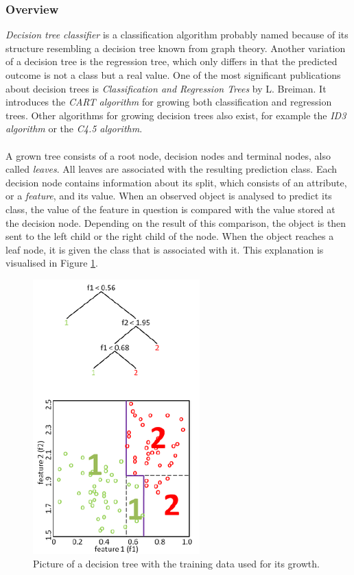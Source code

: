 \documentclass[11pt]{article}
\begin{document}
      \subsubsection{Overview}
        {\it Decision tree classifier} is a classification algorithm probably named because of its structure resembling a decision tree known from graph theory. Another variation of a decision tree is the regression tree, which only differs in that the predicted outcome is not a class but a real value. One of the most significant publications about decision trees is {\it Classification and Regression Trees} by L. Breiman. It introduces the {\it CART algorithm} for growing both classification and regression trees. \citep{cart} Other algorithms for growing decision trees also exist, for example the {\it ID3 algorithm} or the {\it C4.5 algorithm}.
        \\~\\
        A grown tree consists of a root node, decision nodes and terminal nodes, also called {\it leaves}. All leaves are associated with the resulting prediction class. Each decision node contains information about its split, which consists of an attribute, or a {\it feature}, and its value. When an observed object is analysed to predict its class, the value of the feature in question is compared with the value stored at the decision node. Depending on the result of this comparison, the object is then sent to the left child or the right child of the node. When the object reaches a leaf node, it is given the class that is associated with it. This explanation is visualised in Figure \ref{figure:decision_tree}.
        \begin{figure}
          \centering
          \includegraphics{thesis_res/decision_tree.png}
          \caption{Picture of a decision tree with the training data used for its growth. \citep{digstaining}}
          \label{figure:decision_tree}
        \end{figure}
\end{document}
